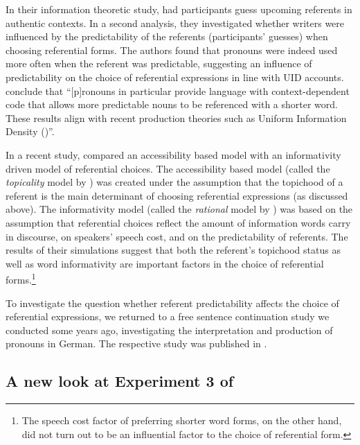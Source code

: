 \documentclass[output=paper,colorlinks,citecolor=brown]{langscibook}
\begin{document}
In their information theoretic study, \citet{Tily::Piantadosi-09} had participants guess upcoming referents in authentic contexts. In a second analysis, they investigated whether writers were influenced by the predictability of the referents (participants' guesses) when choosing referential forms. The authors found that pronouns were indeed used more often when the referent was predictable, suggesting an influence of predictability on the choice of referential expressions in line with UID accounts. \citet{Tily::Piantadosi-09} conclude that \enquote{[p]ronouns in particular provide language with context-dependent code that allows more predictable nouns to be referenced with a shorter word. These results align with recent production theories such as Uniform Information Density (\citealt{Genzel::Charniak-02, Jaeger-06-thesis, Levy::Jaeger-06})}.

In a recent study, \citet{Orita::al-21} compared an accessibility based model with an informativity driven model of referential choices. The accessibility based model (called the \textit{topicality} model by \citeauthor{Orita::al-21}) was created under the assumption that the topichood of a referent is the main determinant of choosing referential expressions (as discussed above). The informativity model (called the \textit{rational} model by \citeauthor{Orita::al-21}) was based on the assumption that referential choices reflect the amount of information words carry in discourse, on speakers' speech cost, and on the predictability of referents. The results of their simulations suggest that both the referent's topichood status as well as word informativity are important factors in the choice of referential forms.\footnote{The speech cost factor of preferring shorter word forms, on the other hand, did not turn out to be an influential factor to the choice of referential form.}

To investigate the question whether referent predictability affects the choice of referential expressions, we returned to a free sentence continuation study we conducted some years ago, investigating the interpretation and production of pronouns in German. The respective study was published in \citet{Bader::Portele-19-The-interpretation-of}.


\subsection{A new look at Experiment 3 of \citet{Bader::Portele-19-The-interpretation-of}}\label{sec:exp-BP19}
\end{document}

